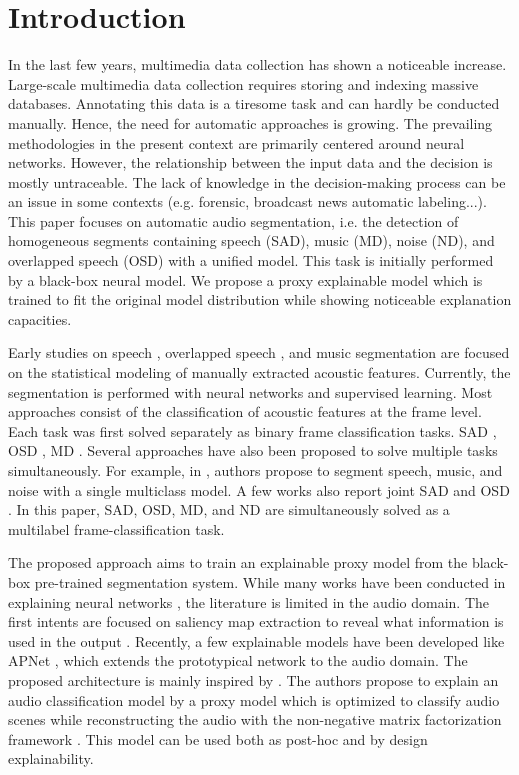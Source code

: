 \section{Introduction}

In the last few years, multimedia data collection has shown a noticeable increase.
Large-scale multimedia data collection requires storing and indexing massive databases.
Annotating this data is a tiresome task and can hardly be conducted manually.
Hence, the need for automatic approaches is growing.
The prevailing methodologies in the present context are primarily centered around neural networks.
However, the relationship between the input data and the decision is mostly untraceable.
The lack of knowledge in the decision-making process can be an issue in some contexts (e.g. forensic, broadcast news automatic labeling...). 
This paper focuses on automatic audio segmentation, i.e. the detection of homogeneous segments containing speech (SAD), music (MD), noise (ND), and overlapped speech (OSD) with a unified model.
This task is initially performed by a black-box neural model. 
We propose a proxy explainable model which is trained to fit the original model distribution while showing noticeable explanation capacities. 

Early studies on speech \cite{sohn1999statistical}, overlapped speech \cite{charlet_impact_2013}, and music \cite{lavner2009decision} segmentation are focused on the statistical modeling of manually extracted acoustic features.
Currently, the segmentation is performed with neural networks and supervised learning.
Most approaches consist of the classification of acoustic features at the frame level.
Each task was first solved separately as binary frame classification tasks.
SAD \cite{lavechin2019end}, OSD \cite{bullock_overlap-aware_2020,lebourdais22_interspeech}, MD \cite{jang2019music,de2019exploring}.
Several approaches have also been proposed to solve multiple tasks simultaneously.
For example, in \cite{gimeno2020multiclass}, authors propose to segment speech, music, and noise with a single multiclass model.
A few works also report joint SAD and OSD \cite{jung21_interspeech,bredin21_interspeech,lebourdais2023joint}.
In this paper, SAD, OSD, MD, and ND are simultaneously solved as a multilabel frame-classification task.

The proposed approach aims to train an explainable proxy model from the black-box pre-trained segmentation system.
While many works have been conducted in explaining neural networks \cite{}, the literature is limited in the audio domain.
The first intents are focused on saliency map extraction to reveal what information is used in the output \cite{}.
Recently, a few explainable models have been developed like APNet \cite{zinemanas2021interpretable}, which extends the prototypical network to the audio domain.
The proposed architecture is mainly inspired by \cite{parekh2023tackling}.
The authors propose to explain an audio classification model by a proxy model which is optimized to classify audio scenes while reconstructing the audio with the non-negative matrix factorization framework \cite{lee2000algorithms}.
This model can be used both as post-hoc and by design explainability.


